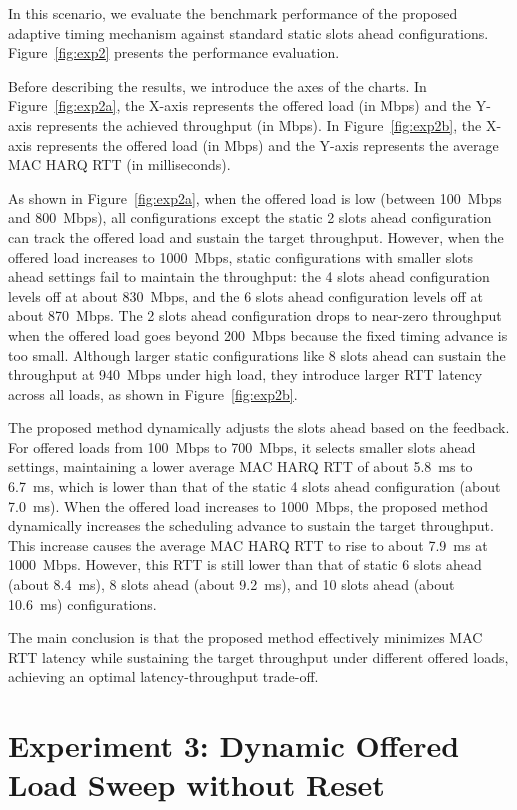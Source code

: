 \documentclass[../my_ntust_thesis.tex]{subfiles}
\begin{document}
In this scenario, we evaluate the benchmark performance of the proposed adaptive timing mechanism against standard static slots ahead configurations. Figure~\ref{fig:exp2} presents the performance evaluation.

Before describing the results, we introduce the axes of the charts. In Figure~\ref{fig:exp2a}, the X-axis represents the offered load (in Mbps) and the Y-axis represents the achieved throughput (in Mbps). In Figure~\ref{fig:exp2b}, the X-axis represents the offered load (in Mbps) and the Y-axis represents the average MAC HARQ RTT (in milliseconds).

As shown in Figure~\ref{fig:exp2a}, when the offered load is low (between 100~Mbps and 800~Mbps), all configurations except the static 2 slots ahead configuration can track the offered load and sustain the target throughput. However, when the offered load increases to 1000~Mbps, static configurations with smaller slots ahead settings fail to maintain the throughput: the 4 slots ahead configuration levels off at about 830~Mbps, and the 6 slots ahead configuration levels off at about 870~Mbps. The 2 slots ahead configuration drops to near-zero throughput when the offered load goes beyond 200~Mbps because the fixed timing advance is too small. Although larger static configurations like 8 slots ahead can sustain the throughput at 940~Mbps under high load, they introduce larger RTT latency across all loads, as shown in Figure~\ref{fig:exp2b}.

The proposed method dynamically adjusts the slots ahead based on the feedback. For offered loads from 100~Mbps to 700~Mbps, it selects smaller slots ahead settings, maintaining a lower average MAC HARQ RTT of about 5.8~ms to 6.7~ms, which is lower than that of the static 4 slots ahead configuration (about 7.0~ms). When the offered load increases to 1000~Mbps, the proposed method dynamically increases the scheduling advance to sustain the target throughput. This increase causes the average MAC HARQ RTT to rise to about 7.9~ms at 1000~Mbps. However, this RTT is still lower than that of static 6 slots ahead (about 8.4~ms), 8 slots ahead (about 9.2~ms), and 10 slots ahead (about 10.6~ms) configurations.

The main conclusion is that the proposed method effectively minimizes MAC RTT latency while sustaining the target throughput under different offered loads, achieving an optimal latency-throughput trade-off.

\section{Experiment 3: Dynamic Offered Load Sweep without Reset}
\label{subsec:scenario_expadd1}
\end{document}
